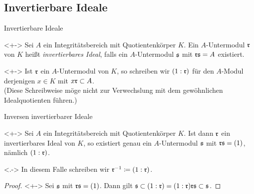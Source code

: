 \subsection{Invertierbare Ideale}

\begin{frame}{Invertierbare Ideale}
	\begin{definition}<+->
		Sei \(A\) ein Integritätsbereich mit Quotientenkörper \(K\).
		Ein \(A\)-Untermodul \(\mathfrak{r}\) von \(K\) heißt \emph{invertierbares
		Ideal}, falls ein \(A\)-Untermodul \(\mathfrak{s}\) mit \(\mathfrak{r}
		\mathfrak{s} = A\) existiert.
	\end{definition}
	\begin{visibleenv}<+->
		Ist \(\mathfrak{r}\) ein \(A\)-Untermodul von \(K\), so schreiben wir
		\((1 : \mathfrak{r})\) für den \(A\)-Modul derjenigen \(x \in K\) mit
		\(x \mathfrak{r} \subset A\).
		\\
		(Diese Schreibweise möge nicht zur Verwechslung mit dem gewöhnlichen
		Idealquotienten führen.)
	\end{visibleenv}
\end{frame}

\begin{frame}{Inversen invertierbarer Ideale}
	\begin{proposition}<+->
		Sei \(A\) ein Integritätsbereich mit Quotientenkörper \(K\).
		Ist dann \(\mathfrak{r}\) ein invertierbares Ideal von \(K\), so existiert
		genau ein \(A\)-Untermodul \(\mathfrak{s}\) mit \(\mathfrak{r} \mathfrak{s} = (1)\),
		nämlich \((1 : \mathfrak{r})\).
	\end{proposition}
	\begin{visibleenv}<.->
		In diesem Falle schreiben wir \(\mathfrak{r}^{-1} \coloneqq (1 : \mathfrak{r})\).
	\end{visibleenv}
	\begin{proof}<+->
		Sei \(\mathfrak{s}\) mit \(\mathfrak{r}\mathfrak{s} = (1)\). Dann gilt
		\(\mathfrak{s} \subset (1 : \mathfrak{r}) = (1 : \mathfrak{r}) \mathfrak{r} \mathfrak{s}
		\subset \mathfrak{s}\).
	\end{proof}
\end{frame}

